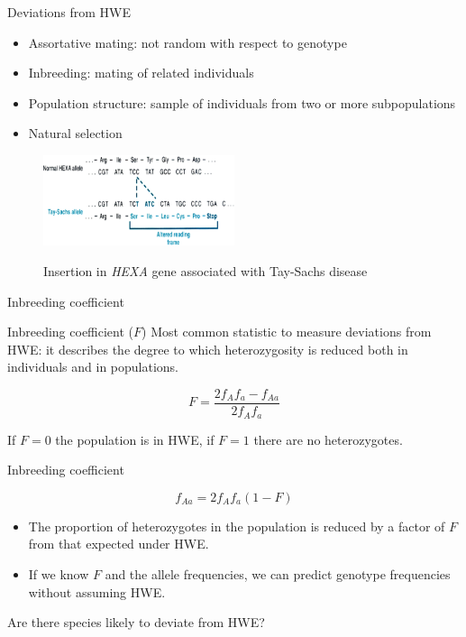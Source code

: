 \begin{frame}{Deviations from HWE}

        \small
        \begin{itemize}
                \item Assortative mating: not random with respect to genotype
                \item Inbreeding: mating of related individuals
                \item Population structure: sample of individuals from two or more subpopulations
		\item Natural selection
        \end{itemize}

	\begin{figure}
        	\includegraphics[width=0.5\textwidth]{Pics/tay} \\
		\caption{Insertion in \textit{HEXA} gene associated with Tay-Sachs disease}
        \end{figure}


\end{frame}


\begin{frame}{Inbreeding coefficient}

	\small
	\begin{block}{Inbreeding coefficient ($F$)}
		Most common statistic to measure deviations from HWE: it describes the degree to which heterozygosity
		is reduced both in individuals and in populations.
	\end{block}

	\begin{equation}
		F = \frac{2f_Af_a - f_{Aa}}{2f_Af_a}
	\end{equation}

	\bigskip

	If $F=0$ the population is in HWE, if $F=1$ \pause there are no heterozygotes.

\end{frame}


\begin{frame}{Inbreeding coefficient}

	\small
	\begin{equation}
		f_{Aa} = 2f_Af_a(1-F)
	\end{equation}

	\begin{itemize}
		\item The proportion of heterozygotes in the population is reduced by a factor of $F$ from that expected under HWE.
		\item If we know $F$ and the allele frequencies, we can predict genotype frequencies without assuming HWE.
	\end{itemize}

	Are there species likely to deviate from HWE?

\end{frame}


